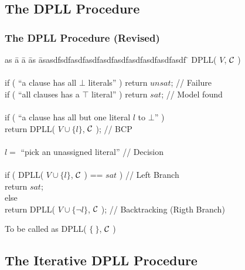 \subsection{The DPLL Procedure}

\begin{frame}
  \frametitle{The DPLL Procedure (Revised)}

  \scriptsize

  \begin{tabbing}
  as \= a \= a \= as \= asasdfsdfasdfasdfasdfasdfasdfasdfasdfasdf \= \kill
  DPLL( $V$, $\mathcal{C}$ ) \\ \\
  \> if ( ``a clause has all $\bot$ literals'' ) return $unsat$; \> \> \> \>  // Failure \\
  \> if ( ``all clauses has a $\top$ literal'' ) return $sat$; \> \> \> \>  // Model found \\ \\
  \pause
  \> if ( ``a clause has all but one literal $l$ to $\bot$'' )  \\
  \> \> return DPLL( $V \cup \{ l \}$, $\mathcal{C}$ );   \> \> \>               // BCP \\ \\
  \pause
  \> $l =$ ``pick an unassigned literal'' \> \> \> \>                          // Decision \\ \\
  \pause
  \> if ( DPLL( $V \cup \{ l \}$, $\mathcal{C}$ ) == $sat$ )        \> \> \> \>  // Left Branch\\
  \> \> return $sat$; \\
  \> else \\
  \> \> return DPLL( $V \cup \{ \neg l \}$, $\mathcal{C}$ );           \> \> \>  // Backtracking (Rigth Branch)
  \end{tabbing}

  \vfill
  \pause

  To be called as DPLL( $\{\ \}$, $\mathcal{C}$ )

\end{frame}

\subsection{The Iterative DPLL Procedure}


